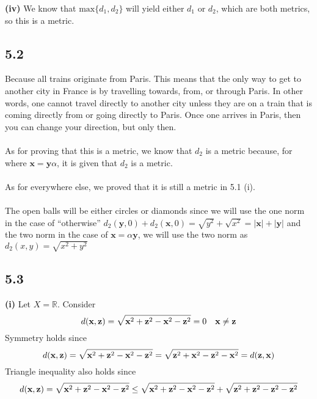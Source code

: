 \documentclass[letterpaper,12pt]{article}
\theoremstyle{definition}
\begin{document}
\textbf{(iv)}
We know that $\text{max} \{d_1,d_2\} $ will yield either $d_1$ or $d_2$, which are both metrics, so this is a metric.

\subsection*{5.2}
Because all trains originate from Paris. This means that the only way to get to another city in France is by travelling towards, from, or through Paris. In other words, one cannot travel directly to another city unless they are on a train that is coming directly from or going directly to Paris. Once one arrives in Paris, then you can change your direction, but only then. \\\\
As for proving that this is a metric, we know that $d_2$ is a metric because, for where $ \textbf{x} = \textbf{y} \alpha$, it is given that $d_2$ is a metric.  \\\\
As for everywhere else, we proved that it is still a metric in 5.1 (i).
\\\\
The open balls will be either circles or diamonds since we will use the one norm in the case of ``otherwise'' $d_2( \textbf{y}, 0) + d_2 ( \textbf{x}, 0 ) = \sqrt{y^2} + \sqrt{x^2} = | \textbf{x}| + | \textbf{y}|    $ and the two norm in the case of $ \textbf{x} = \alpha \textbf{y}  $, we will use the two norm as $d_2(x,y) = \sqrt{x^2 + y^2}$

\subsection*{5.3}
\textbf{(i)}
Let $X = \mathbb{R}$.
Consider 
\[d(\textbf{x},\textbf{\textbf{z}}) = \sqrt{\textbf{x}^2 + \textbf{\textbf{z}}^2 - \textbf{x}^2 - \textbf{\textbf{z}}^2} = 0 \quad \textbf{x}\neq \textbf{\textbf{z}} \]
Symmetry holds since
\[d(\textbf{x},\textbf{\textbf{z}}) = \sqrt{\textbf{x}^2 + \textbf{\textbf{z}}^2 - \textbf{x}^2 - \textbf{\textbf{z}}^2} = \sqrt{\textbf{\textbf{z}}^2 + \textbf{x}^2 - \textbf{\textbf{z}}^2 - \textbf{x}^2} =d(\textbf{\textbf{z}},\textbf{x})\]
Triangle inequality also holds since
\[d(\textbf{x},\textbf{\textbf{z}}) = \sqrt{\textbf{x}^2 + \textbf{\textbf{z}}^2 - \textbf{x}^2 - \textbf{\textbf{z}}^2} \leq \sqrt{\textbf{x}^2 + \textbf{z}^2 - \textbf{x}^2 - \textbf{z}^2} + \sqrt{\textbf{z}^2 + \textbf{\textbf{z}}^2 - \textbf{z}^2 - \textbf{\textbf{z}}^2}\]
\end{document}
